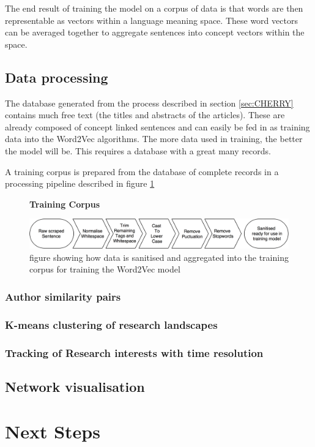 \documentclass[11pt, oneside]{article}   	%
\begin{document}
The end result of training the model on a corpus of data is that words are then representable as vectors within a language meaning space. These word vectors can be averaged together to aggregate sentences into concept vectors within the space.
\subsection{Data processing}
The database generated from the process described in section \ref{sec:CHERRY} contains much free text (the titles and abstracts of the articles). These are already composed of concept linked sentences and can easily be fed in as training data into the Word2Vec algorithms. The more data used in training, the better the model will be. This requires a database with a great many records\cite{HEWHOHASDATA}\cite{WORD2VEC}. 

A training corpus is prepared from the database of complete records in a processing pipeline described in figure \ref{fig:CORPUSGEN}
\begin{figure}[H]
    \centering
    \textbf{Training Corpus}\par\medskip
    \includegraphics[scale=0.14]{CORPUSGEN.png}
    \caption{figure showing how data is sanitised and aggregated into the training corpus for training the Word2Vec model \label{fig:CORPUSGEN}}
\end{figure}
\subsubsection{Author similarity pairs}
\subsubsection{K-means clustering of research landscapes}
\subsubsection{Tracking of Research interests with time resolution}
\subsection{Network visualisation}
\section{Next Steps}
\end{document}
